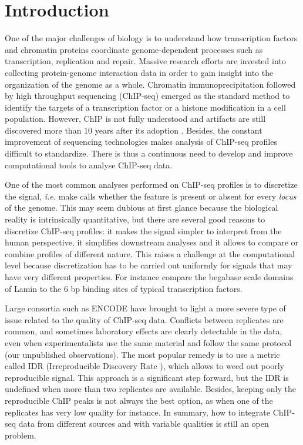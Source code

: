 \documentclass{bioinfo}
\begin{document}
\section{Introduction}
One of the major challenges of biology is to understand how transcription
factors and chromatin proteins coordinate genome-dependent processes 
such as transcription, replication and repair. Massive research efforts
are invested into collecting protein-genome interaction data in order
to gain insight into the organization of the genome as a whole. Chromatin
immunoprecipitation followed by high throughput sequencing (ChIP-seq)
emerged as the standard method to identify the targets of a transcription
factor or a histone modification in a cell population. However, ChIP is not
fully understood and artifacts are still discovered more than 10 years after
its adoption \citep{pmid24349523, pmid24173036}. Besides, the constant
improvement of sequencing technologies makes analysis of ChIP-seq profiles
difficult to standardize. There is thus a continuous need to develop and
improve computational tools to analyse ChIP-seq data.

One of the most common analyses performed on ChIP-seq profiles is to
discretize the signal, \textit{i.e.} make calls whether the feature is
present or absent for every \textit{locus} of the genome. This may seem
dubious at first glance because the biological reality is intrinsically
quantitative, but there are several good reasons to discretize ChIP-seq
profiles: it makes the signal simpler to interpret from the human
perspective, it simplifies downstream analyses and it allows to compare or
combine profiles of different nature. This raises a challenge at the
computational level because discretization has to be carried out uniformly
for signals that may have very different properties. For instance compare
the begabase scale domains of Lamin \citep{pmid18463634} to the 6 bp
binding sites of typical transcription factors.

Large consortia such as ENCODE have brought to light a more severe type
of issue related to the quality of ChIP-seq data. Conflicts between
replicates are common, and
sometimes laboratory effects are clearly detectable in the data,
even when experimentalists use the same material and follow the same
protocol (our unpublished observations). The most popular remedy is to
use a metric called IDR (Irreproducible Discovery Rate \cite{li2011}),
which allows to weed
out poorly reproducible signal. This approach is a significant step
forward, but the IDR is undefined when more than two replicates are
available. Besides, keeping only the reproducible ChIP peaks is not
always the best option, as when one of the replicates has very low quality
for instance. In summary, how to integrate ChIP-seq data from different
sources and with variable qualities is still an open problem.
\end{document}
